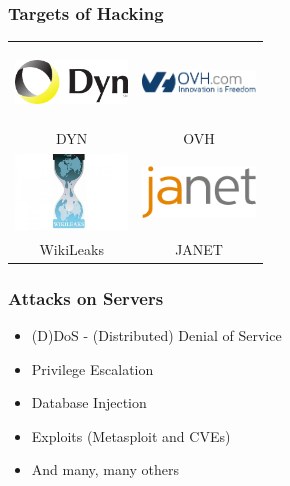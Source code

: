 \documentclass[10pt]{beamer}
\begin{document}
  \begin{frame}
    \frametitle{Targets of Hacking}
    \centering
    \begin{tabular}{c c}
      \includegraphics[height=2cm,width=3cm,keepaspectratio]{dyn.png}        &
      \includegraphics[height=2cm,width=3cm,keepaspectratio]{ovh.png}       \\
      DYN \cite{dyndns}                                                      &
      OVH \cite{ovhcld}                                                     \\
      \includegraphics[height=2cm,width=3cm,keepaspectratio]{wikileaks.jpeg} &
      \includegraphics[height=2cm,width=3cm,keepaspectratio]{janet.png}     \\
      WikiLeaks \cite{wiklks}                                                &
      JANET \cite{janisp}                                                   \\
    \end{tabular}
  \end{frame}
  \begin{frame}
    \frametitle{Attacks on Servers}
    \begin{itemize}
      \item (D)DoS - (Distributed) Denial of Service
      \item Privilege Escalation
      \item Database Injection
      \item Exploits (Metasploit and CVEs)
      \item And many, many others
    \end{itemize}
  \end{frame}
\end{document}
